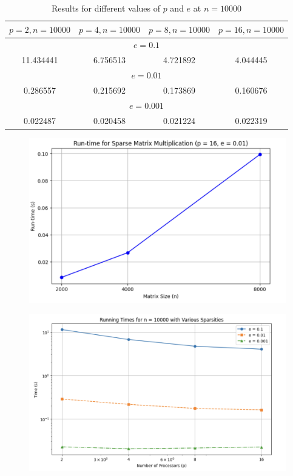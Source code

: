 \documentclass{article}
\begin{document}
\begin{table}[H]
\centering
\begin{tabular}{cccc}
\toprule
\( p = 2, n = 10000 \) & \( p = 4, n = 10000 \) & \( p = 8, n = 10000 \) & \( p = 16, n = 10000 \) \\
\midrule
\multicolumn{4}{c}{\( e = 0.1 \)} \\
11.434441 & 6.756513 & 4.721892 & 4.044445 \\
\multicolumn{4}{c}{\( e = 0.01 \)} \\
0.286557 & 0.215692 & 0.173869 & 0.160676 \\
\multicolumn{4}{c}{\( e = 0.001 \)} \\
0.022487 & 0.020458 & 0.021224 & 0.022319 \\
\bottomrule
\end{tabular}
\caption{Results for different values of \( p \) and \( e \) at \( n = 10000 \)}
\end{table}

\begin{figure}[H]
    \centering
    \includegraphics[width=1\linewidth]{Screenshot 2024-04-21 at 23.30.45.png}
\end{figure}

\begin{figure}[H]
    \centering
    \includegraphics[width=1\linewidth]{Screenshot 2024-04-21 at 23.31.25.png}
\end{figure}
\end{document}
